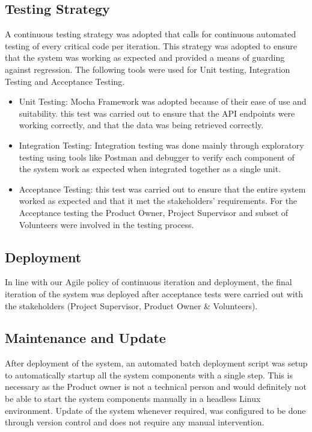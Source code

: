 \subsection{Testing Strategy}
A continuous testing strategy was adopted that calls for continuous automated testing of every critical code per iteration. This strategy was adopted to ensure 
that the system was working as expected and provided a means of guarding against regression. 
The following tools were used for Unit testing, Integration Testing and Acceptance Testing.

\begin{itemize}
    \item Unit Testing: Mocha Framework was adopted because of their ease of use and suitability. this test was carried out to ensure that the API endpoints were working correctly, and that the data was being retrieved correctly.
    \item Integration Testing: Integration testing was done mainly through exploratory testing using tools like Postman and debugger to verify each component of the system
        work as expected when integrated together as a single unit. 
    \item Acceptance Testing: this test was carried out to ensure that the entire system worked as expected and that it met the stakeholders' requirements. For the Acceptance 
        testing the Product Owner, Project Supervisor and subset of Volunteers were involved in the testing process. 
\end{itemize}
    

\subsection{Deployment}
In line with our Agile policy of continuous iteration and deployment, the final iteration of the system was deployed after acceptance tests were carried out
with the stakeholders (Project Supervisor, Product Owner \& Volunteers).

\subsection{Maintenance and Update}

After deployment of the system, an automated batch deployment script was setup to automatically startup all the system components with a single step. 
This is necessary as the Product owner is not a technical person and would definitely not be able to start the system components manually in a headless 
Linux environment. Update of the system whenever required, was configured to be done through version control and does not require any manual intervention. 



